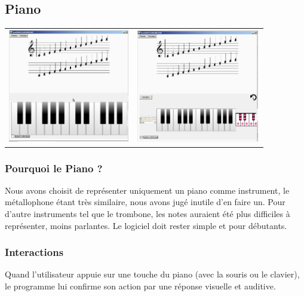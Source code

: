 \documentclass{article}
\begin{document}
\subsection{Piano}
\begin{center}
\begin{tabular}{cc}

	\includegraphics[width = 200px]{./images/entierGrand.png}

	&

	\includegraphics[width = 205px]{./images/entierPetit.png}

	\\
\end{tabular}
\end{center}

\subsubsection{Pourquoi le Piano ?}
Nous avons choisit de représenter uniquement un piano comme instrument, le métallophone étant très similaire, nous avons
jugé inutile d'en faire un. Pour d'autre instruments tel que le trombone, les notes auraient été plus difficiles à représenter,
moins parlantes. Le logiciel doit rester simple et pour débutants.
\subsubsection{Interactions}
Quand l'utilisateur appuie sur une touche du piano (avec la souris ou le clavier),
le programme lui confirme son action par une réponse visuelle et auditive.
\end{document}
